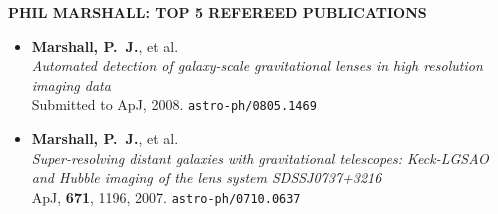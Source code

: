
\begin{center}
{\bf \Large P{\large HIL} M{\large ARSHALL}: T{\large OP} 5 R{\large EFEREED} P{\large UBLICATIONS}}
\end{center}

\begin{itemize}
 
\item{\textbf{{Marshall}, P.~J.}, et al.\\
\textit{Automated detection of galaxy-scale gravitational lenses in high resolution imaging data}\\
Submitted to ApJ, 2008.
\texttt{astro-ph/0805.1469}
}


 

\item{\textbf{{Marshall}, P.~J.}, et al.\\
\textit{Super-resolving distant galaxies with gravitational telescopes: Keck-LGSAO and Hubble imaging of the lens system SDSSJ0737+3216}\\
ApJ, \textbf{671}, 1196, 2007.
\texttt{astro-ph/0710.0637}}



\end{itemize}
